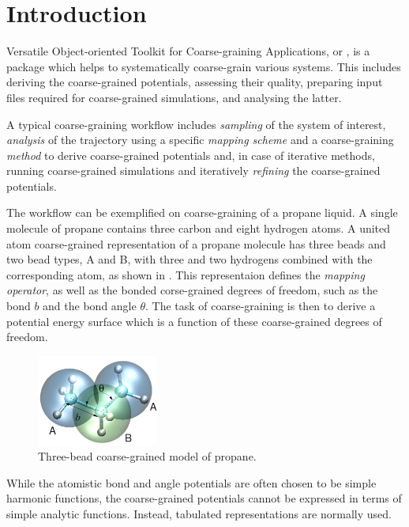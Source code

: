 \chapter{Introduction}

\denis

Versatile Object-oriented Toolkit for Coarse-graining Applications, or \votca, is a package which helps to systematically coarse-grain various systems. This includes  deriving the coarse-grained potentials, assessing their quality, preparing input files required for coarse-grained simulations, and analysing the latter. 

A typical coarse-graining workflow includes {\em sampling} of the system of interest, {\em analysis} of the trajectory using a specific {\em mapping scheme} and a coarse-graining {\em method} to derive coarse-grained potentials and, in case of iterative methods, running coarse-grained simulations and iteratively {\em refining} the coarse-grained potentials.

The workflow can be exemplified on coarse-graining of a propane liquid. A single molecule of propane contains three carbon and eight hydrogen atoms. A united atom coarse-grained representation of a propane molecule has three beads and two bead types, A and B, with three and two hydrogens combined with the corresponding atom, as shown in . This representaion defines the {\em mapping operator}, as well as the bonded corse-grained degrees of freedom, such as the bond $b$ and the bond angle $\theta$. The task of coarse-graining is then to derive a potential energy surface which is a function of these coarse-grained degrees of freedom.

\begin{figure}
 \includegraphics[width=4cm]{fig/propane}
 \caption{\small Three-bead coarse-grained model of propane.
 \label{fig:intro:propane}
}
\end{figure}

While the atomistic bond and angle potentials are often chosen to be simple harmonic functions, the coarse-grained potentials cannot be expressed in terms of simple analytic functions. Instead, tabulated representations are normally used. 

